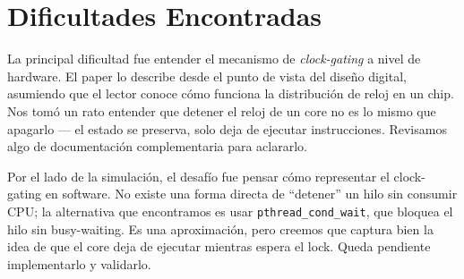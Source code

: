 
\section{Dificultades Encontradas}

La principal dificultad fue entender el mecanismo de \textit{clock-gating} a
nivel de hardware. El paper lo describe desde el punto de vista del diseño
digital, asumiendo que el lector conoce cómo funciona la distribución de reloj
en un chip. Nos tomó un rato entender que detener el reloj de un core no es lo
mismo que apagarlo — el estado se preserva, solo deja de ejecutar instrucciones.
Revisamos algo de documentación complementaria para aclararlo.

Por el lado de la simulación, el desafío fue pensar cómo representar el
clock-gating en software. No existe una forma directa de ``detener'' un hilo
sin consumir CPU; la alternativa que encontramos es usar
\texttt{pthread\_cond\_wait}, que bloquea el hilo sin busy-waiting. Es una
aproximación, pero creemos que captura bien la idea de que el core deja de
ejecutar mientras espera el lock. Queda pendiente implementarlo y validarlo.

